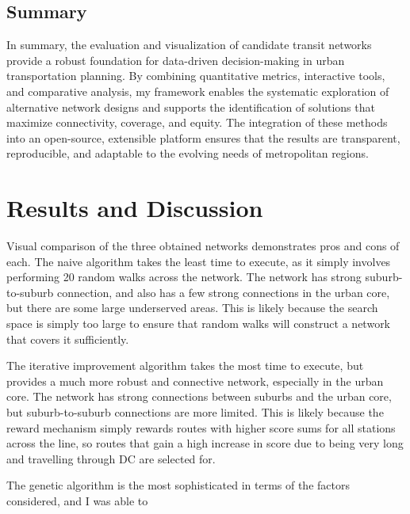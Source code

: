 \documentclass[manuscript,nonacm]{acmart}
\begin{document}
\subsection{Summary}
In summary, the evaluation and visualization of candidate transit networks provide a robust foundation for data-driven decision-making in urban transportation planning. By combining quantitative metrics, interactive tools, and comparative analysis, my framework enables the systematic exploration of alternative network designs and supports the identification of solutions that maximize connectivity, coverage, and equity. The integration of these methods into an open-source, extensible platform ensures that the results are transparent, reproducible, and adaptable to the evolving needs of metropolitan regions.

\section{Results and Discussion}

Visual comparison of the three obtained networks demonstrates pros and cons of each. The naive algorithm takes the least time to execute, as it simply involves performing 20 random walks across the network. The network has strong suburb-to-suburb connection, and also has a few strong connections in the urban core, but there are some large underserved areas. This is likely because the search space is simply too large to ensure that random walks will construct a network that covers it sufficiently.

The iterative improvement algorithm takes the most time to execute, but provides a much more robust and connective network, especially in the urban core. The network has strong connections between suburbs and the urban core, but suburb-to-suburb connections are more limited. This is likely because the reward mechanism simply rewards routes with higher score sums for all stations across the line, so routes that gain a high increase in score due to being very long and travelling through DC are selected for.

The genetic algorithm is the most sophisticated in terms of the factors considered, and I was able to 
\end{document}
